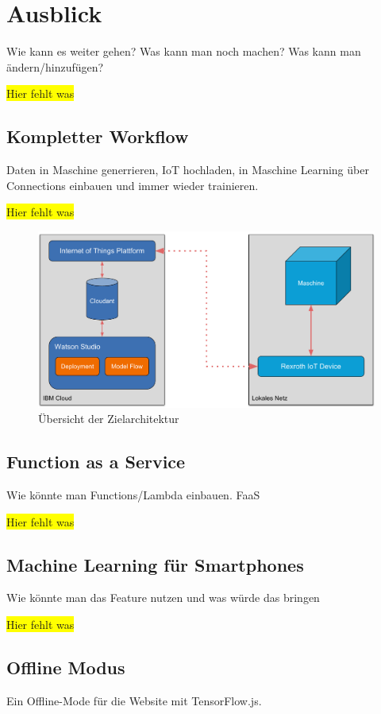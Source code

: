 \chapter{Ausblick}
\label{ch:ausblick}
Wie kann es weiter gehen? Was kann man noch machen? Was kann man ändern/hinzufügen?

\colorbox{yellow}{Hier fehlt was}

\section{Kompletter Workflow}
Daten in Maschine generrieren, IoT hochladen, in Maschine Learning über Connections einbauen und immer wieder
trainieren.

\colorbox{yellow}{Hier fehlt was}

\begin{figure}[h]
    \centering
    \includegraphics[scale=0.5]{images/kapitel_6/architektur_uebersicht.pdf}
    \caption{Übersicht der Zielarchitektur}
    \label{fig:ausblick_uebersicht}
\end{figure}

\section{Function as a Service}
Wie könnte man Functions/Lambda einbauen. FaaS

\colorbox{yellow}{Hier fehlt was}

\section{Machine Learning für Smartphones}
Wie könnte man das Feature nutzen und was würde das bringen

\colorbox{yellow}{Hier fehlt was}

\section{Offline Modus}
Ein Offline-Mode für die Website mit TensorFlow.js.

